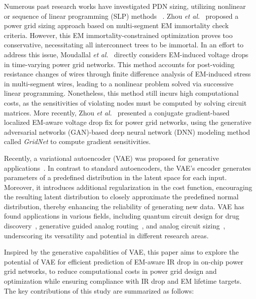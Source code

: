 Numerous past research works have investigated PDN sizing,
utilizing nonlinear or sequence of linear programming (SLP) methods
 ~\cite{ChBr:TCAD'88,DuMa:DAC'89,Tan:DAC'99,Wang:TCAD'05,ZhouSun:TVLSI'19, Sukharev:2019pg,ZhouYu:ASPDAC'20,ZhouJin:ICCAD'20}.
 Zhou {\it et al.}~\cite{ZhouSun:TVLSI'19,ZhouChen:Integration'21} proposed a power grid sizing approach based on multi-segment EM immortality check criteria. However, this EM immortality-constrained optimization proves too conservative, necessitating all interconnect trees to be immortal. In an effort to address this issue, Moudallal {\it et al.}~\cite{Sukharev:2019pg} directly considers EM-induced voltage drops in time-varying power grid networks. This method accounts for post-voiding resistance changes of wires through finite difference analysis of EM-induced stress in multi-segment wires, leading to a nonlinear problem solved via successive linear programming. Nonetheless, this method still incurs high computational costs, as the sensitivities of violating nodes must be computed by solving circuit matrices. More recently, Zhou {\it et al.}~\cite{ZhouJin:ICCAD'20, HanLiu:TCAD'22-23} presented a conjugate gradient-based localized EM-aware voltage drop fix for power grid networks, using the generative adversarial networks (GAN)-based deep neural network (DNN) modeling method called {\it GridNet} to compute gradient sensitivities.


Recently, a variational autoencoder (VAE) was proposed for generative applications~\cite{Diederik:arxiv'22}. In contrast to standard autoencoders, the VAE's encoder generates parameters of a predefined distribution in the latent space for each input. Moreover, it introduces additional regularization in the cost function, encouraging the resulting latent distribution to closely approximate the predefined normal distribution, thereby enhancing the reliability of generating new data. VAE has found applications in various fields, including quantum circuit design for drug discovery~\cite{Li:DATE'22}, generative guided analog routing~\cite{Zhu:ICCAD'19}, and analog circuit sizing~\cite{Touloupas:SMACD'22}, underscoring its versatility and potential in different research areas.


Inspired by the generative capabilities of VAE, this paper aims to explore the potential of VAE for efficient prediction of EM-aware IR drop in on-chip power grid networks, to reduce computational costs in power grid design and optimization while ensuring compliance with IR drop and EM lifetime targets. The key contributions of this study are summarized as follows:

